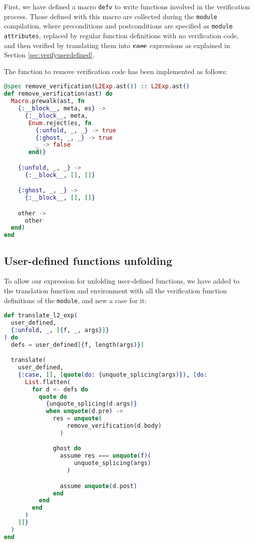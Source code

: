 First, we have defined a macro \verb|defv| to write functions involved in the
verification process. Those defined with this macro are collected during the
\verb|module| compilation, where preconditions and postconditions are specified
as \verb|module attributes|, replaced by regular function definitions with no
verification code, and then verified by translating them into $\textbf{case}$
expressions as explained in Section \ref{sec:verifyuserdefined}.

The function to remove verification code has been implemented as follows:

\begin{lstlisting}[language=elixir,numbers=none,frame=none]
@spec remove_verification(L2Exp.ast()) :: L2Exp.ast()
def remove_verification(ast) do
  Macro.prewalk(ast, fn
    {:__block__, meta, es} ->
      {:__block__, meta,
       Enum.reject(es, fn
         {:unfold, _, _} -> true
         {:ghost, _, _} -> true
         _ -> false
       end)}

    {:unfold, _, _} ->
      {:__block__, [], []}

    {:ghost, _, _} ->
      {:__block__, [], []}

    other ->
      other
  end)
end
\end{lstlisting}

\subsection{User-defined functions unfolding}

To allow our expression for unfolding user-defined functions, we have added to
the translation function and environment with all the verification function
definitions of the \verb|module|, and new a case for it:

\begin{lstlisting}[language=elixir,numbers=none,frame=none]
def translate_l2_exp(
  user_defined, 
  {:unfold, _, [{f, _, args}]}
) do
  defs = user_defined[{f, length(args)}]

  translate(
    user_defined,
    {:case, [], [quote(do: {unquote_splicing(args)}), [do:
      List.flatten(
        for d <- defs do
          quote do
            {unquote_splicing(d.args)}
            when unquote(d.pre) ->
              res = unquote(
                  remove_verification(d.body)
                )

              ghost do
                assume res === unquote(f)(
                    unquote_splicing(args)
                  )

                assume unquote(d.post)
              end
          end
        end
      )
    ]]}
  )
end
\end{lstlisting} 